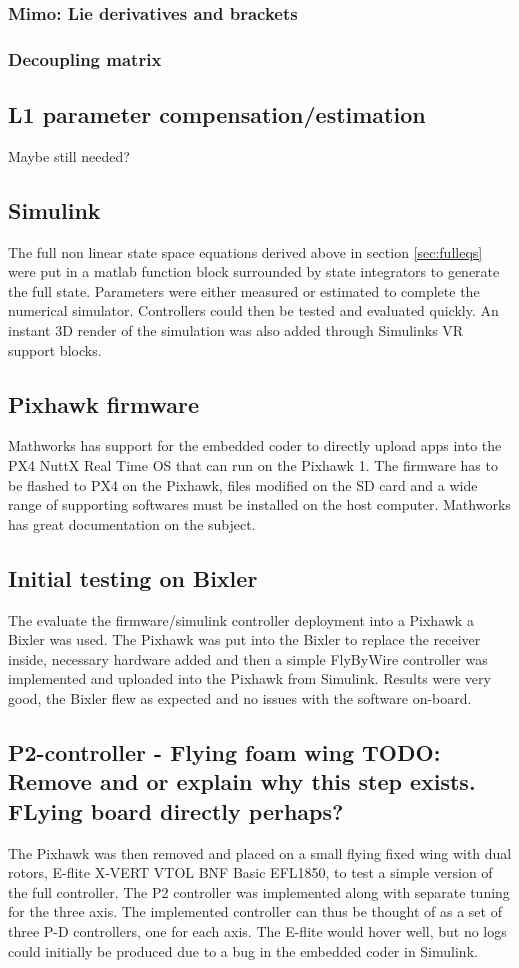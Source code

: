 \documentclass{article}
\begin{document}
\subsubsection{Mimo: Lie derivatives and brackets}
\subsubsection{Decoupling matrix}
\subsection{L1 parameter compensation/estimation}
Maybe still needed?


\subsection{Simulink}
The full non linear state space equations derived above in section \ref{sec:fulleqs} were put in a matlab function block surrounded by state integrators to generate the full state.
Parameters were either measured or estimated to complete the numerical simulator.
Controllers could then be tested and evaluated quickly.
An instant 3D render of the simulation was also added through Simulinks VR support blocks.

\subsection{Pixhawk firmware}
Mathworks has support for the embedded coder to directly upload apps into the PX4 NuttX Real Time OS that can run on the Pixhawk 1.
The firmware has to be flashed to PX4 on the Pixhawk, files modified on the SD card and a wide range of supporting softwares must be installed on the host computer.
Mathworks has great documentation on the subject.\cite{MathworksPX4}

\subsection{Initial testing on Bixler}
The evaluate the firmware/simulink controller deployment into a Pixhawk a Bixler was used.
The Pixhawk was put into the Bixler to replace the receiver inside, necessary hardware added and then a simple FlyByWire controller was implemented and uploaded into the Pixhawk from Simulink.
Results were very good, the Bixler flew as expected and no issues with the software on-board.


\subsection{P2-controller - Flying foam wing TODO: Remove and or explain why this step exists. FLying board directly perhaps?}
The Pixhawk was then removed and placed on a small flying fixed wing with dual rotors, E-flite X-VERT VTOL BNF Basic EFL1850, to test a simple version of the full controller.
The P2 controller \cite{P2} was implemented along with separate tuning for the three axis.
The implemented controller can thus be thought of as a set of three P-D controllers, one for each axis.
The E-flite would hover well, but no logs could initially be produced due to a bug in the embedded coder in Simulink.
\end{document}
